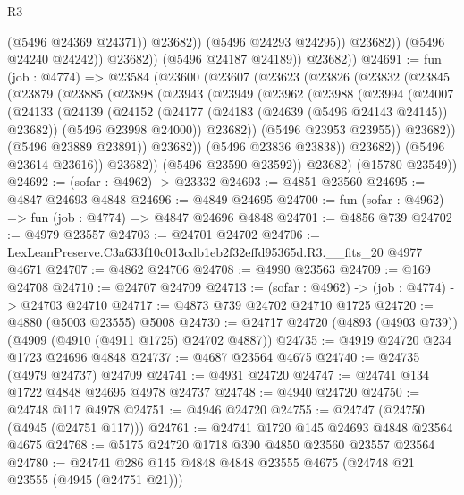 \begin{lexlean}{R3}
\begin{coremodule}
                            (@5496 @24369 @24371))
                          @23682))
                      (@5496 @24293 @24295))
                    @23682))
                (@5496 @24240 @24242))
              @23682))
          (@5496 @24187 @24189))
        @23682))
@24691 := fun (job : @4774) =>
  @23584
    (@23600
      (@23607
        (@23623
          (@23826
            (@23832
              (@23845
                (@23879
                  (@23885
                    (@23898
                      (@23943
                        (@23949
                          (@23962
                            (@23988
                              (@23994
                                (@24007
                                  (@24133
                                    (@24139
                                      (@24152
                                        (@24177 (@24183 (@24639 (@5496 @24143 @24145)) @23682))
                                        (@5496 @23998 @24000))
                                      @23682))
                                  (@5496 @23953 @23955))
                                @23682))
                            (@5496 @23889 @23891))
                          @23682))
                      (@5496 @23836 @23838))
                    @23682))
                (@5496 @23614 @23616))
              @23682))
          (@5496 @23590 @23592))
        @23682)
      (@15780 @23549))
@24692 := (sofar : @4962) -> @23332
@24693 := @4851 @23560
@24695 := @4847 @24693 @4848
@24696 := @4849 @24695
@24700 := fun (sofar : @4962) => fun (job : @4774) => @4847 @24696 @4848
@24701 := @4856 @739
@24702 := @4979 @23557
@24703 := @24701 @24702
@24706 := LexLeanPreserve.C3a633f10c013cdb1eb2f32effd95365d.R3.__fits_20 @4977 @4671
@24707 := @4862 @24706
@24708 := @4990 @23563
@24709 := @169 @24708
@24710 := @24707 @24709
@24713 := (sofar : @4962) -> (job : @4774) -> @24703 @24710
@24717 := @4873 @739 @24702 @24710 @1725
@24720 := @4880 (@5003 @23555) @5008
@24730 := @24717 @24720 (@4893 (@4903 @739)) (@4909 (@4910 (@4911 @1725) @24702 @4887))
@24735 := @4919 @24720 @234 @1723 @24696 @4848
@24737 := @4687 @23564 @4675
@24740 := @24735 (@4979 @24737) @24709
@24741 := @4931 @24720
@24747 := @24741 @134 @1722 @4848 @24695 @4978 @24737
@24748 := @4940 @24720
@24750 := @24748 @117 @4978
@24751 := @4946 @24720
@24755 := @24747 (@24750 (@4945 (@24751 @117)))
@24761 := @24741 @1720 @145 @24693 @4848 @23564 @4675
@24768 := @5175 @24720 @1718 @390 @4850 @23560 @23557 @23564
@24780 := @24741 @286 @145 @4848 @4848 @23555 @4675 (@24748 @21 @23555 (@4945 (@24751 @21)))

\end{coremodule}
\end{lexlean}
